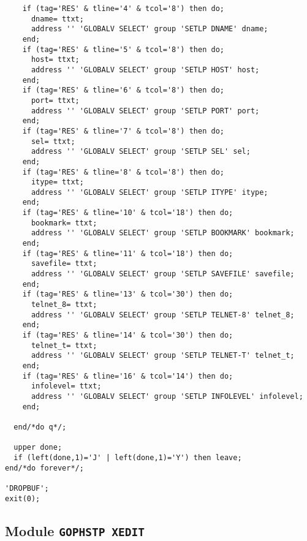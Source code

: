 \begin{verbatim}
    if (tag='RES' & tline='4' & tcol='8') then do;
      dname= ttxt;
      address '' 'GLOBALV SELECT' group 'SETLP DNAME' dname;
    end;
    if (tag='RES' & tline='5' & tcol='8') then do;
      host= ttxt;
      address '' 'GLOBALV SELECT' group 'SETLP HOST' host;
    end;
    if (tag='RES' & tline='6' & tcol='8') then do;
      port= ttxt;
      address '' 'GLOBALV SELECT' group 'SETLP PORT' port;
    end;
    if (tag='RES' & tline='7' & tcol='8') then do;
      sel= ttxt;
      address '' 'GLOBALV SELECT' group 'SETLP SEL' sel;
    end;
    if (tag='RES' & tline='8' & tcol='8') then do;
      itype= ttxt;
      address '' 'GLOBALV SELECT' group 'SETLP ITYPE' itype;
    end;
    if (tag='RES' & tline='10' & tcol='18') then do;
      bookmark= ttxt;
      address '' 'GLOBALV SELECT' group 'SETLP BOOKMARK' bookmark;
    end;
    if (tag='RES' & tline='11' & tcol='18') then do;
      savefile= ttxt;
      address '' 'GLOBALV SELECT' group 'SETLP SAVEFILE' savefile;
    end;
    if (tag='RES' & tline='13' & tcol='30') then do;
      telnet_8= ttxt;
      address '' 'GLOBALV SELECT' group 'SETLP TELNET-8' telnet_8;
    end;
    if (tag='RES' & tline='14' & tcol='30') then do;
      telnet_t= ttxt;
      address '' 'GLOBALV SELECT' group 'SETLP TELNET-T' telnet_t;
    end;
    if (tag='RES' & tline='16' & tcol='14') then do;
      infolevel= ttxt;
      address '' 'GLOBALV SELECT' group 'SETLP INFOLEVEL' infolevel;
    end;

  end/*do q*/;

  upper done;
  if (left(done,1)='J' | left(done,1)='Y') then leave;
end/*do forever*/;

'DROPBUF';
exit(0);
\end{verbatim}

\subsection{Module {\tt GOPHSTP XEDIT}}

\def\LPtopD{Module {\tt GOPHSTP XEDIT}}

\def\LPtopF{~}

